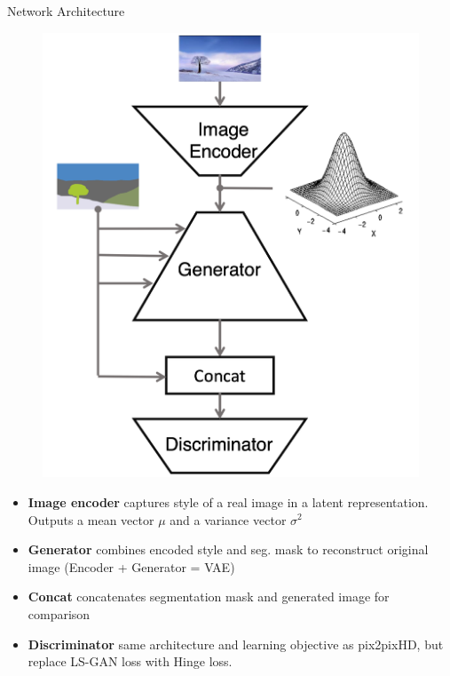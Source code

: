 \documentclass{beamer}
\begin{document}
\begin{frame}{Network Architecture}

    \begin{minipage}[b]{0.3\linewidth}
        \centering
        \begin{figure}
            \includegraphics[scale=0.18]{figures/gan_architecture.png}
        \end{figure}
    \end{minipage}
    \hspace{0.5cm}
    \begin{minipage}[b]{0.6\linewidth}
        \centering
        \begin{itemize}[<+->]
            \item \textbf{Image encoder} captures style of a real image in a latent representation. Outputs a mean vector $\mu$ and a variance vector $\sigma^2$
            \item \textbf{Generator} combines encoded style and seg. mask to reconstruct original image (Encoder + Generator = VAE) 
            \item \textbf{Concat} concatenates segmentation mask and generated image for comparison
            \item \textbf{Discriminator} same architecture and learning objective as pix2pixHD, but replace LS-GAN loss with Hinge loss.
        \end{itemize}
    \end{minipage}
\end{frame}
\end{document}
